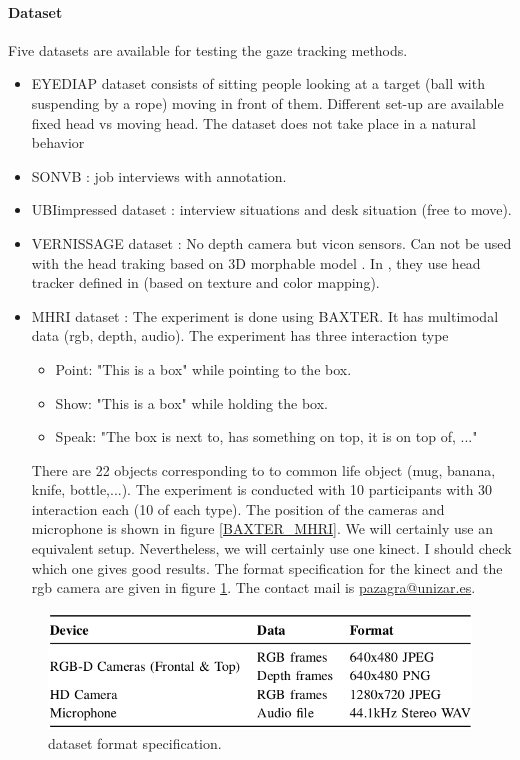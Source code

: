 \documentclass[11pt,a4paper]{article}
\begin{document}
\paragraph{Dataset} Five datasets are available for testing the gaze tracking methods.
\begin{itemize}
\item EYEDIAP dataset \cite{EYEDIAP2014} consists of sitting people looking at a target (ball with suspending by a rope) moving in front of them. Different set-up are available fixed head vs moving head. The dataset does not take place in a natural behavior
\item SONVB \cite{Nguyen2014}: job interviews with annotation.
\item UBIimpressed dataset \cite{Muralidhar2016}: interview situations and desk situation (free to move).
\item VERNISSAGE dataset \cite{Vernissage2013}: No depth camera but vicon sensors. Can not be used with the head traking based on 3D morphable model \cite{Funes2016,Siegfried2017}. In \cite{Sheikhi2O15}, they use head tracker defined in \cite{Khalidov} (based on texture and color mapping).
\item MHRI dataset \cite{Azagra2017}: The experiment is done using BAXTER. It has multimodal data (rgb, depth, audio). The experiment has three interaction type
\begin{itemize}
\item Point: "This is a box" while pointing to the box.
\item Show: "This is a box" while holding the box.
\item Speak: "The box is next to, has something on top, it is on top of, ..."
\end{itemize}
There are 22 objects corresponding to to common life object (mug, banana, knife, bottle,...). The experiment is conducted with 10 participants with 30 interaction each (10 of each type). The position of the cameras and microphone is shown in figure \ref{BAXTER_MHRI}. We will certainly use an equivalent setup. Nevertheless, we will certainly use one kinect. I should check which one gives good results. The  format specification for the kinect and the rgb camera are given in figure \ref{TableCamera_MHRI}. The contact mail is \url{pazagra@unizar.es}.
\end{itemize}
\begin{figure}[!h]
\centering
\includegraphics[scale=0.4]{Pictures/TableCamera_MHRI.png}
\caption{dataset format specification. \label{TableCamera_MHRI}}
\end{figure}
\end{document}
